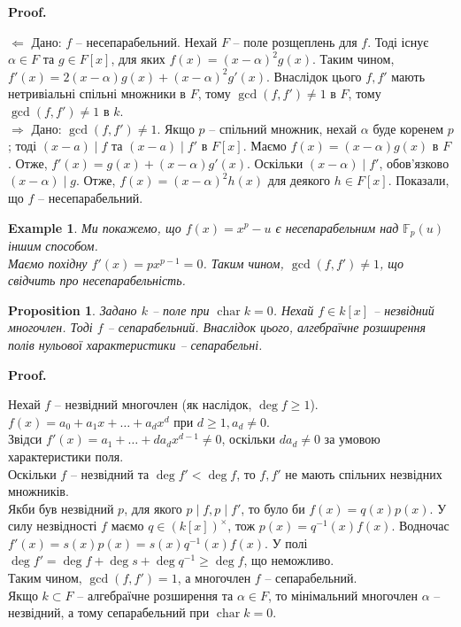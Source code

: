\documentclass[a4paper, 10pt]{article}
\makeatletter
\def\rightproof{$\boxed{\Rightarrow}$ }
\def\leftproof{$\boxed{\Leftarrow}$ }
\theoremstyle{theoremdd}
\theoremstyle{theoremdd}
\theoremstyle{theoremdd}
\theoremstyle{theoremdd}
\theoremstyle{theoremdd}
\newtheorem{example}[theorem]{Example}
\theoremstyle{theoremdd}
\theoremstyle{theoremdd}
\theoremstyle{theoremdd}
\theoremstyle{theoremdd}
\newtheorem{proposition}[theorem]{Proposition}
\theoremstyle{theoremdd}
\theoremstyle{theoremdd}
\theoremstyle{theoremdd}
\theoremstyle{theoremdd}
\theoremstyle{theoremdd}
\theoremstyle{theoremdd}
\renewenvironment{proof}[1][Proof.\\]{\par
\pushQED{\hfill \qed}%
\normalfont \topsep6\p@\@plus6\p@\relax
\trivlist
\item\relax
{\bfseries
#1\@addpunct{.}}\hspace\labelsep\ignorespaces
}{%
\popQED\endtrivlist\@endpefalse
}
\DeclareMathOperator{\charac}{char}
\makeatother
\begin{document}
\begin{proof}
\leftproof Дано: $f$ -- несепарабельний. Нехай $F$ -- поле розщеплень для $f$. Тоді існує $\alpha \in F$ та $g \in F[x]$, для яких $f(x) = (x-\alpha)^2 g(x)$. Таким чином, $f'(x) = 2(x-\alpha)g(x) + (x-\alpha)^2 g'(x)$. Внаслідок цього $f,f'$ мають нетривіальні спільні множники в $F$, тому $\gcd(f,f') \neq 1$ в $F$, тому $\gcd(f,f') \neq 1$ в $k$.
\bigskip \\
\rightproof Дано: $\gcd(f,f') \neq 1$. Якщо $p$ -- спільний множник, нехай $\alpha$ буде коренем $p$; тоді $(x-a) \mid f$ та $(x-a) \mid f'$ в $F[x]$. Маємо $f(x) = (x-\alpha)g(x)$ в $F$. Отже, $f'(x) = g(x) + (x-\alpha)g'(x)$. Оскільки $(x-\alpha) \mid f'$, обов'язково $(x-\alpha) \mid g$. Отже, $f(x) = (x-\alpha)^2 h(x)$ для деякого $h \in F[x]$. Показали, що $f$ -- несепарабельний.
\end{proof}

\begin{example}
Ми покажемо, що $f(x) = x^p - u$ є несепарабельним над $\mathbb{F}_p(u)$ іншим способом.\\
Маємо похідну $f'(x) = p x^{p-1} = 0$. Таким чином, $\gcd(f,f') \neq 1$, що свідчить про несепарабельність.
\end{example}

\begin{proposition}
Задано $k$ -- поле при $\charac k = 0$. Нехай $f \in k[x]$ -- незвідний многочлен. Тоді $f$ -- сепарабельний. Внаслідок цього, алгебраїчне розширення полів нульової характеристики -- сепарабельні.
\end{proposition}

\begin{proof}
Нехай $f$ -- незвідний многочлен (як наслідок, $\deg f \geq 1$).\\
$f(x) = a_0 + a_1 x + \dots + a_d x^d$ при $d \geq 1, a_d \neq 0$.\\
Звідси $f'(x) = a_1 + \dots + d a_d x^{d-1} \neq 0$, оскільки $da_d \neq 0$ за умовою характеристики поля.\\
Оскільки $f$ -- незвідний та $\deg f' < \deg f$, то $f,f'$ не мають спільних незвідних множників.\\
Якби був незвідний $p$, для якого $p \mid f, p \mid f'$, то було би $f(x) = q(x) p(x)$. У силу незвідності $f$ маємо $q \in (k[x])^\times$, тож $p(x) = q^{-1}(x)f(x)$. Водночас $f'(x) = s(x)p(x) = s(x)q^{-1}(x)f(x)$. У полі $\deg f' = \deg f + \deg s + \deg q^{-1} \geq \deg f$, що неможливо.\\
Таким чином, $\gcd(f,f') = 1$, а многочлен $f$ -- сепарабельний.\\
Якщо $k \subset F$ -- алгебраїчне розширення та $\alpha \in F$, то мінімальний многочлен $\alpha$ -- незвідний, а тому сепарабельний при $\charac k = 0$.
\end{proof}
\end{document}
